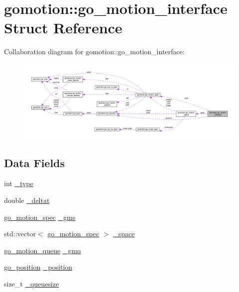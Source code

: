 \hypertarget{structgomotion_1_1go__motion__interface}{\section{gomotion\-:\-:go\-\_\-motion\-\_\-interface Struct Reference}
\label{structgomotion_1_1go__motion__interface}
}


Collaboration diagram for gomotion\-:\-:go\-\_\-motion\-\_\-interface\-:\nopagebreak
\begin{figure}[H]
\begin{center}
\leavevmode
\includegraphics[width=350pt]{d3/d89/structgomotion_1_1go__motion__interface__coll__graph}
\end{center}
\end{figure}
\subsection*{Data Fields}
\begin{DoxyCompactItemize}
\item 
int \hyperlink{structgomotion_1_1go__motion__interface_a10ef45dfc2f8c62e518fb23bacef0fda}{\-\_\-type}
\item 
double \hyperlink{structgomotion_1_1go__motion__interface_a450ed54375d304ec8e2b00be571f7fb2}{\-\_\-deltat}
\item 
\hyperlink{structgomotion_1_1go__motion__spec}{go\-\_\-motion\-\_\-spec} \hyperlink{structgomotion_1_1go__motion__interface_a027cf7ca47ea59b2ce242a9ada705ea5}{\-\_\-gms}
\item 
std\-::vector$<$ \hyperlink{structgomotion_1_1go__motion__spec}{go\-\_\-motion\-\_\-spec} $>$ \hyperlink{structgomotion_1_1go__motion__interface_a9de0b8636128c1107ce815c5e44a9c28}{\-\_\-space}
\item 
\hyperlink{structgomotion_1_1go__motion__queue}{go\-\_\-motion\-\_\-queue} \hyperlink{structgomotion_1_1go__motion__interface_ab7801d0e1621e18025d2a3446648ac5e}{\-\_\-gmq}
\item 
\hyperlink{structgomotion_1_1go__position}{go\-\_\-position} \hyperlink{structgomotion_1_1go__motion__interface_a1da77c6de12dd3b2714bb55ebe041924}{\-\_\-position}
\item 
size\-\_\-t \hyperlink{structgomotion_1_1go__motion__interface_a26585b0cd74b71796be70d71ac6c2b63}{\-\_\-queuesize}
\end{DoxyCompactItemize}
